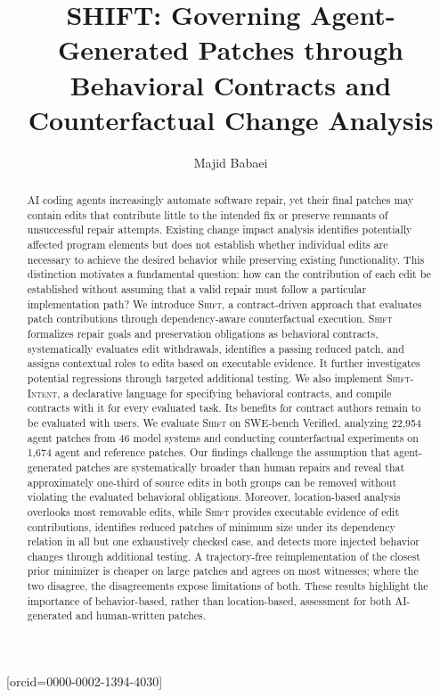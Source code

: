 \documentclass[a4paper,fleqn]{cas-sc}
\newcommand{\tool}{\textsc{Shift}}
\newcommand{\dsl}{\textsc{Shift-Intent}}
\begin{document}
\let\WriteBookmarks\relax
{}
\title[mode=title]{SHIFT: Governing Agent-Generated Patches through Behavioral Contracts and Counterfactual Change Analysis}
\author[1]{Majid Babaei}[orcid=0000-0002-1394-4030]
\cormark[1]

\begin{abstract}
AI coding agents increasingly automate software repair, yet their final patches may contain edits that contribute little to the intended fix or preserve remnants of unsuccessful repair attempts. Existing change impact analysis identifies potentially affected program elements but does not establish whether individual edits are necessary to achieve the desired behavior while preserving existing functionality. This distinction motivates a fundamental question: how can the contribution of each edit be established without assuming that a valid repair must follow a particular implementation path? We introduce \tool{}, a contract-driven approach that evaluates patch contributions through dependency-aware counterfactual execution. \tool{} formalizes repair goals and preservation obligations as behavioral contracts, systematically evaluates edit withdrawals, identifies a passing reduced patch, and assigns contextual roles to edits based on executable evidence. It further investigates potential regressions through targeted additional testing. We also implement \dsl{}, a declarative language for specifying behavioral contracts, and compile contracts with it for every evaluated task. Its benefits for contract authors remain to be evaluated with users. We evaluate \tool{} on SWE-bench Verified, analyzing 22,954 agent patches from 46 model systems and conducting counterfactual experiments on 1,674 agent and reference patches. Our findings challenge the assumption that agent-generated patches are systematically broader than human repairs and reveal that approximately one-third of source edits in both groups can be removed without violating the evaluated behavioral obligations. Moreover, location-based analysis overlooks most removable edits, while \tool{} provides executable evidence of edit contributions, identifies reduced patches of minimum size under its dependency relation in all but one exhaustively checked case, and detects more injected behavior changes through additional testing. A trajectory-free reimplementation of the closest prior minimizer is cheaper on large patches and agrees on most witnesses; where the two disagree, the disagreements expose limitations of both. These results highlight the importance of behavior-based, rather than location-based, assessment for both AI-generated and human-written patches.




\end{abstract}
\end{document}
